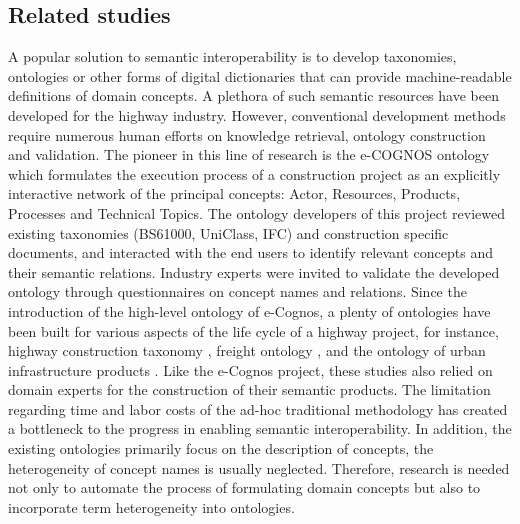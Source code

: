 \documentclass[Journal, BackFigs,NoLists, DoubleSpace]{ascelike}%
\begin{document}
\subsection{Related studies}
A popular solution to semantic interoperability is to develop taxonomies, ontologies or other forms of digital dictionaries that can provide machine-readable definitions of domain concepts. A plethora of such semantic resources have been developed for the highway industry. However, conventional development methods require numerous human efforts on knowledge retrieval, ontology construction and validation. The pioneer in this line of research is the e-COGNOS ontology \cite{wetherill02,lima05} which formulates the execution process of a construction project as an explicitly interactive network of the principal concepts: Actor, Resources, Products, Processes and Technical Topics. The ontology developers of this project reviewed existing taxonomies (BS61000, UniClass, IFC) and construction specific documents, and interacted with the end users to identify relevant concepts and their semantic relations. Industry experts were invited to validate the developed ontology through questionnaires on concept names and relations. Since the introduction of the high-level ontology of e-Cognos, a plenty of ontologies have been built for various aspects of the life cycle of a highway project, for instance, highway construction taxonomy \cite{el-diraby05,el-diraby05b}, freight ontology \cite{seedah15}, and the ontology of urban infrastructure products \cite{osman06}. Like the e-Cognos project, these studies also relied on domain experts for the construction of their semantic products. The limitation regarding time and labor costs of the ad-hoc traditional methodology has created a bottleneck to the progress in enabling semantic interoperability. In addition, the existing ontologies primarily focus on the description of concepts, the heterogeneity of concept names is usually neglected. Therefore, research is needed not only to automate the process of formulating domain concepts but also to incorporate term heterogeneity into ontologies.
\par
\end{document}
